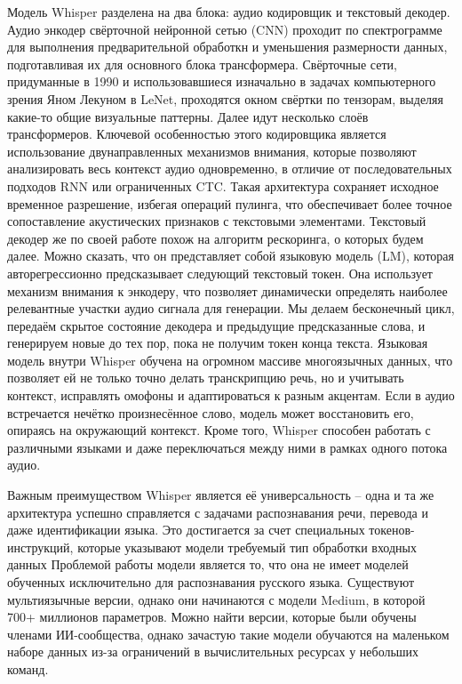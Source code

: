 Модель Whisper разделена на два блока: аудио кодировщик и текстовый декодер.
Аудио энкодер свёрточной нейронной сетью (CNN) проходит по спектрограмме для выполнения предварительной обработкн и уменьшения размерности данных, подготавливая их для основного блока трансформера.
Свёрточные сети, придуманные в 1990 и использовавшиеся изначально в задачах компьютерного зрения Яном Лекуном в LeNet\cite{LeCun1989}, проходятся окном свёртки по тензорам, выделяя какие-то общие визуальные паттерны.
Далее идут несколько слоёв трансформеров.
Ключевой особенностью этого кодировщика является использование двунаправленных механизмов внимания, которые позволяют анализировать весь контекст аудио  одновременно, в отличие от последовательных подходов RNN или ограниченных CTC.
Такая архитектура сохраняет исходное временное разрешение, избегая операций пулинга, что обеспечивает более точное сопоставление акустических признаков с текстовыми элементами.
Текстовый декодер же по своей работе похож на алгоритм рескоринга, о которых будем далее.
Можно сказать, что он представляет собой языковую модель (LM), которая авторегрессионно предсказывает следующий текстовый токен.
Она использует механизм внимания к энкодеру, что позволяет динамически определять наиболее релевантные участки аудио сигнала для генерации.
Мы делаем бесконечный цикл, передаём скрытое состояние декодера и предыдущие предсказанные слова, и генерируем новые до тех пор, пока не получим токен конца текста.
Языковая модель внутри Whisper обучена на огромном массиве многоязычных данных, что позволяет ей не только точно делать транскрипцию речь, но и учитывать контекст, исправлять омофоны и адаптироваться к разным акцентам.
Если в аудио встречается нечётко произнесённое слово, модель может восстановить его, опираясь на окружающий контекст.
Кроме того, Whisper способен работать с различными языками и даже переключаться между ними в рамках одного потока аудио.

Важным преимуществом Whisper является её универсальность -- одна и та же архитектура успешно справляется с задачами распознавания речи, перевода и даже идентификации языка.
Это достигается за счет специальных токенов-инструкций, которые указывают модели требуемый тип обработки входных данных
Проблемой работы модели является то, что она не имеет моделей обученных исключительно для распознавания русского языка.
Существуют мультиязычные версии, однако они начинаются с модели Medium, в которой 700+ миллионов параметров.
Можно найти версии, которые были обучены членами ИИ-сообщества, однако зачастую такие модели обучаются на маленьком наборе данных из-за ограничений в вычислительных ресурсах у небольших команд.

